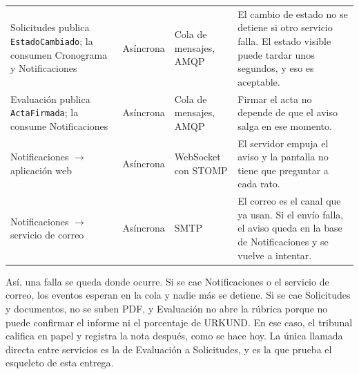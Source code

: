 \begin{xltabular}{\textwidth}{@{}>{\raggedright\arraybackslash}p{3.4cm} >{\raggedright\arraybackslash}p{1.5cm} >{\raggedright\arraybackslash}p{2.2cm} >{\raggedright\arraybackslash}X@{}}
    \addlinespace
    Solicitudes publica \texttt{EstadoCambiado}; la consumen Cronograma y Notificaciones & Asíncrona & Cola de mensajes, AMQP & El cambio de estado no se detiene si otro servicio falla. El estado visible puede tardar unos segundos, y eso es aceptable. \\
    \addlinespace
    Evaluación publica \texttt{ActaFirmada}; la consume Notificaciones & Asíncrona & Cola de mensajes, AMQP & Firmar el acta no depende de que el aviso salga en ese momento. \\
    \addlinespace
    Notificaciones $\rightarrow$aplicación web & Asíncrona & WebSocket con STOMP & El servidor empuja el aviso y la pantalla no tiene que preguntar a cada rato. \\
    \addlinespace
    Notificaciones $\rightarrow$servicio de correo & Asíncrona & SMTP & El correo es el canal que ya usan. Si el envío falla, el aviso queda en la base de Notificaciones y se vuelve a intentar. \\
\end{xltabular}
\endgroup

Así, una falla se queda donde ocurre. Si se cae Notificaciones o el servicio de correo, los eventos esperan en la cola y nadie más se detiene. Si se cae Solicitudes y documentos, no se suben PDF, y Evaluación no abre la rúbrica porque no puede confirmar el informe ni el porcentaje de URKUND. En ese caso, el tribunal califica en papel y registra la nota después, como se hace hoy. La única llamada directa entre servicios es la de Evaluación a Solicitudes, y es la que prueba el esqueleto de esta entrega.
